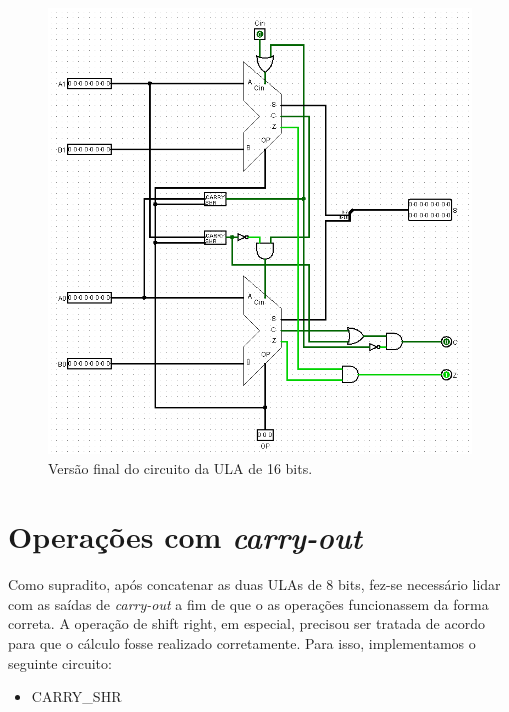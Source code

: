 \documentclass[
	12pt,				%
	openright,			%
	twoside,			%
	a4paper,			%
	english,			%
	french,				%
	spanish,			%
	brazil,				%
	]{abntex2}
\begin{document}
\begin{figure}[H]
	\begin{center}
	    \includegraphics[scale=0.48]{imagens/ULA16.png}
	\end{center}
\caption{\label{ula16}Versão final do circuito da ULA de 16 bits.}
\end{figure}

\section{Operações com \textit{carry-out}}\label{opcarry}
Como supradito, após concatenar as duas ULAs de 8 bits, fez-se necessário lidar com as saídas de \textit{carry-out} a fim de que o as operações funcionassem da forma correta. A operação de shift right, em especial, precisou ser tratada de acordo para que o cálculo fosse realizado corretamente.
Para isso, implementamos o seguinte circuito:

\begin{itemize}
  \item  CARRY\_SHR
\end{itemize}
\end{document}
